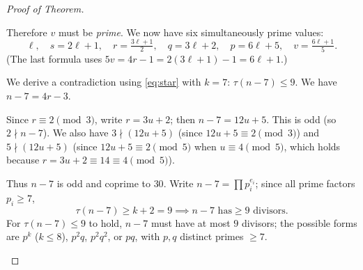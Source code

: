 \documentclass[11pt]{article}
\begin{document}
\begin{proof}[Proof of Theorem]
\begin{itemize}
\begin{itemize}
    Therefore $v$ must be \emph{prime}.  We now have six simultaneously prime
    values:
    \[
      \ell,\quad s = 2\ell + 1,\quad r = \tfrac{3\ell+1}{2},\quad
      q = 3\ell + 2,\quad p = 6\ell + 5,\quad v = \tfrac{6\ell + 1}{5}.
    \]
    (The last formula uses $5v = 4r - 1 = 2(3\ell+1) - 1 = 6\ell + 1$.)

    We derive a contradiction using \eqref{eq:star} with $k = 7$:
    $\tau(n - 7) \le 9$.  We have $n - 7 = 4r - 3$.

    Since $r \equiv 2 \pmod 3$, write $r = 3u + 2$; then
    $n - 7 = 12u + 5$.  This is odd (so $2 \nmid n - 7$).  We
    also have $3 \nmid (12u + 5)$ (since $12u + 5 \equiv 2 \pmod 3$) and
    $5 \nmid (12u + 5)$ (since $12u + 5 \equiv 2 \pmod 5$ when
    $u \equiv 4 \pmod 5$, which holds because $r = 3u + 2 \equiv 14
    \equiv 4 \pmod 5$).

    Thus $n - 7$ is odd and coprime to $30$.
    Write $n - 7 = \prod p_i^{e_i}$; since all prime factors $p_i \ge 7$,
    \[
      \tau(n - 7) \ge k + 2 = 9
      \implies n - 7 \text{ has} \ge 9 \text{ divisors.}
    \]
    For $\tau(n - 7) \le 9$ to hold, $n - 7$ must have at most $9$ divisors;
    the possible forms are $p^k$ ($k \le 8$), $p^2 q$, $p^2 q^2$, or $pq$,
    with $p, q$ distinct primes $\ge 7$.


\end{itemize}
\end{itemize}
\end{proof}
\end{document}
